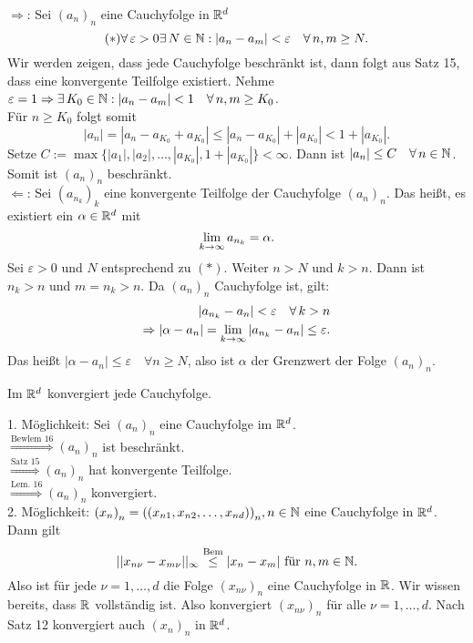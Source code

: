 \documentclass[../ana1.tex]{subfiles}
\begin{document}
\begin{bew}
	\glqq{}\(\Rightarrow \)\grqq{}: Sei \({(a_n)}_n\) eine Cauchyfolge in \(\mathbb{R}^d\)
	\[(*) \forall\varepsilon>0\exists N\in\N: |a_n - a_m|<\varepsilon \quad \forall n,m\geq N. \]
	Wir werden zeigen, dass jede Cauchyfolge beschränkt ist, dann folgt aus Satz 15, dass eine konvergente Teilfolge existiert.
	Nehme \(\varepsilon = 1 \Rightarrow \exists K_0\in\N: |a_n - a_m|<1 \quad \forall n,m\geq K_0\).\\
	Für \(n\geq K_0\) folgt somit \[|a_n| = |a_n - a_{K_0} + a_{K_0}| \leq |a_n - a_{K_0}| + |a_{K_0}| < 1 + |a_{K_0}|.\]
	Setze \(C:= \max \{|a_1|,|a_2|,\dots,|a_{K_0}|,1+|a_{K_0}|\}<\infty \). Dann ist \(|a_n| \leq C \quad \forall n\in\N \). Somit ist \({{(a_n)}_n}\) beschränkt.\\
	\glqq{}\(\Leftarrow{}\)\grqq{}: Sei \({(a_{n_k})}_k\) eine konvergente Teilfolge der Cauchyfolge \({(a_n)}_n\). Das heißt, es existiert ein \(\alpha \in\mathbb{R}^d\) mit
	\[ \lim\limits_{k\rightarrow\infty} a_{n_k} = \alpha. \]
	Sei \(\varepsilon>0\) und \(N\) entsprechend zu \((*)\). Weiter \(n>N\) und \(k>n\). Dann ist \(n_k > n\) und \(m = n_k > n\).
	Da \({(a_n)}_n\) Cauchyfolge ist, gilt:
	\begin{align*}
		|a_{n_k} - a_n| < \varepsilon \quad \forall k>n\\
		\Rightarrow |\alpha - a_n| = \limes{k} |a_{n_k} - a_n| \leq \varepsilon.
	\end{align*}
	Das heißt \(|\alpha - a_n| \leq \varepsilon \quad \forall n\geq N\), also ist \(\alpha \) der Grenzwert der Folge \({(a_n)}_n\).
\end{bew}
\begin{satz}
	Im \(\mathbb{R}^d\) konvergiert jede Cauchyfolge.
\end{satz}
\begin{bew}
	1. Möglichkeit: Sei \({(a_n)}_n\) eine Cauchyfolge im \(\mathbb{R}^d\).\\
	\( \overset{\text{Bewlem 16}}{\Longrightarrow} {(a_n)}_n \) ist beschränkt.\\
	\( \overset{\text{Satz 15}}{\Longrightarrow} {(a_n)}_n\) hat konvergente Teilfolge.\\
	\( \overset{\text{Lem. 16}}{\Longrightarrow} {(a_n)}_n\) konvergiert.\\
	2. Möglichkeit: \({(x_n)}_n = {((x_{n1},x_{n2},\dots,x_{nd}))}_n, n\in\mathbb{N} \) eine Cauchyfolge in \(\mathbb{R}^d\). Dann gilt
	\[ || x_{n\nu} - x_{m\nu} ||_\infty \overset{\text{Bem}}{\leq} |x_n - x_m| \text{ für } n,m\in\mathbb{N}. \]
	Also ist für jede \(\nu = 1,\dots,d\) die Folge \({(x_{n\nu})}_n\) eine Cauchyfolge in \(\mathbb{R} \).
	Wir wissen bereits, dass \(\mathbb{R} \) vollständig ist. Also konvergiert \({(x_{n\nu})}_n\) für alle \(\nu=1,\dots,d\).
	Nach Satz 12 konvergiert auch \({(x_n)}_n\) in \(\mathbb{R}^d\).
\end{bew}
\end{document}
